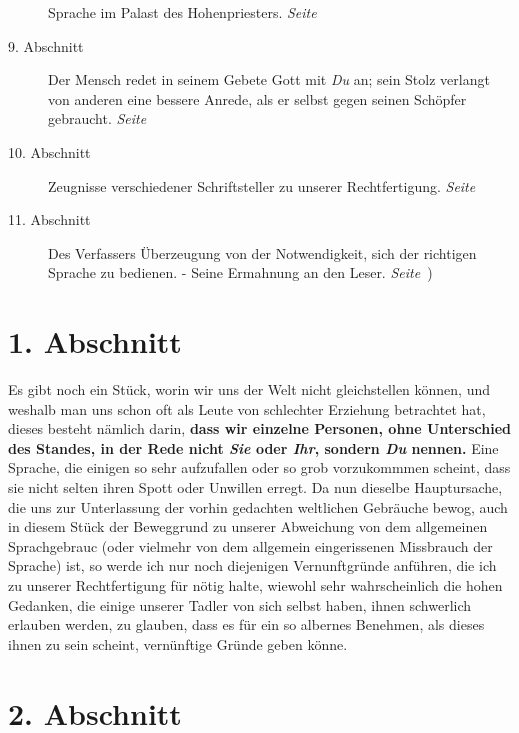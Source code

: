 \begin{description}
Sprache im Palast des Hohenpriesters.
\dotfill \textit{Seite~\pageref{kap10_ab8}}\\
\item[9. Abschnitt] Der Mensch redet in seinem Gebete Gott mit \textit{Du} an;
sein
Stolz verlangt von anderen eine bessere Anrede, als er selbst gegen seinen
Schöpfer gebraucht.
\dotfill \textit{Seite~\pageref{kap10_ab9}}\\
\item[10. Abschnitt] Zeugnisse verschiedener Schriftsteller zu unserer
Rechtfertigung.
\dotfill \textit{Seite~\pageref{kap10_ab10}}\\
\item[11. Abschnitt] Des Verfassers Überzeugung von der Notwendigkeit, sich
der richtigen Sprache zu bedienen. - Seine Ermahnung an den Leser.
\dotfill \textit{Seite~\pageref{kap10_ab11}})

\end{description}

\newpage

\section{1. Abschnitt} \label{kap10_ab1}

Es gibt noch ein Stück, worin wir uns der Welt nicht
gleichstellen können, und
weshalb man uns schon oft als Leute von schlechter Erziehung betrachtet hat,
dieses besteht nämlich darin, \textbf{dass wir einzelne
Personen, ohne Unterschied des
Standes, in der Rede nicht \textit{Sie} oder \textit{Ihr}, sondern \textit{Du}
nennen.} Eine
Sprache, die einigen so sehr aufzufallen oder so grob vorzukommmen scheint, dass
sie nicht selten ihren Spott oder Unwillen erregt. Da nun dieselbe Hauptursache,
die uns zur Unterlassung der vorhin gedachten weltlichen Gebräuche bewog, auch
in diesem Stück der Beweggrund zu unserer Abweichung von dem allgemeinen
Sprachgebrauc (oder vielmehr von dem allgemein eingerissenen Missbrauch der
Sprache) ist, so werde ich nur noch diejenigen Vernunftgründe anführen, die ich
zu unserer Rechtfertigung für nötig halte, wiewohl sehr wahrscheinlich die
hohen Gedanken, die einige unserer Tadler von sich selbst haben, ihnen
schwerlich erlauben werden, zu glauben, dass es für ein so albernes Benehmen, als
dieses ihnen zu sein scheint, vernünftige Gründe geben könne.

\section{2. Abschnitt} \label{kap10_ab2}

